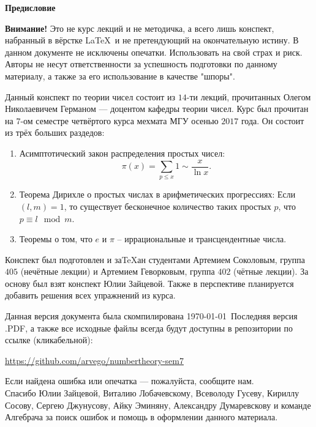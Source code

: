 \begin{center}
	\Large \bf{Предисловие}~\\
\end{center}

\tab \textbf{Внимание!} Это не курс лекций и не методичка, а всего лишь конспект, набранный в вёрстке \LaTeX~{}и не претендующий на окончательную истину. В данном документе не исключены опечатки. Использовать на свой страх и риск. Авторы не несут ответственности за успешность подготовки по данному материалу, а также за его использование в качестве "шпоры".

\tab Данный конспект по теории чисел состоит из $14$-ти лекций, прочитанных Олегом Николаевичем Германом --- доцентом кафедры теории чисел. Курс был прочитан на $7$-ом семестре четвёртого курса мехмата МГУ осенью $2017$ года. Он состоит из трёх больших раздедов:
\begin{enumerate}
 	\item Асимптотический закон распределения простых чисел: 
			$$\pi(x) = \sum_{p \leq x} 1 \sim \frac{x}{\ln x}.$$
	\item Теорема Дирихле о простых числах в арифметических прогрессиях:
			Если $(l, m) = 1$, то существует бесконечное количество таких простых $p$, что $p \equiv l \mod m$.
	\item Теоремы о том, что  $e$ и $\pi$ -- иррациональные и трансцендентные числа.
\end{enumerate}

\tab Конспект был подготовлен и за\TeX ан студентами Артемием Соколовым, группа $405$ (нечётные лекции) и Артемием Геворковым, группа $402$ (чётные лекции). За основу был взят конспект Юлии Зайцевой. Также в перспективе планируется добавить решения всех упражнений из курса.

\tab Данная версия документа была скомпилирована \today~{}Последняя версия .PDF, а также все исходные файлы всегда будут доступны в репозитории по ссылке (кликабельной):
\begin{center}
\href{https://github.com/arvego/numbertheory-sem7}{https://github.com/arvego/numbertheory-sem7}
\end{center}
Если найдена ошибка или опечатка --- пожалуйста, сообщите нам.\\



\tab Спасибо Юлии Зайцевой, Виталию Лобачевскому, Всеволоду Гусеву, Кириллу Сосову, Сергею Джунусову, Айку Эминяну, Александру Думаревскову и команде Алгебрача за поиск ошибок и помощь в оформлении данного материала.